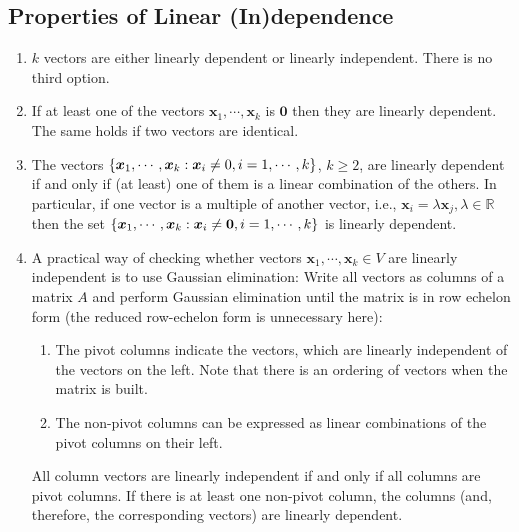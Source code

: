 \subsection{Properties of Linear (In)dependence}
\begin{enumerate}
    \item $k$ vectors are either linearly dependent or linearly independent. There is no third option.
    \hfill \cite{mfml/book/mml/Deisenroth-Faisal-Ong}

    \item If at least one of the vectors $\bm{x}_1, \cdots , \bm{x}_k$ is $\bm{0}$ then they are linearly dependent. 
    The same holds if two vectors are identical.
    \hfill \cite{mfml/book/mml/Deisenroth-Faisal-Ong}

    \item The vectors $\left\{\bm{x}_1, \cdots , \bm{x}_k : \bm{x}_i \neq 0, i = 1, \cdots , k\right\}$, $k \geq 2$, are linearly dependent if and only if (at least) one of them is a linear combination of the others. 
    In particular, if one vector is a multiple of another vector, i.e., $\bm{x}_i = \lambda \bm{x}_j , \lambda \in \mathbb{R}$ then the set $\left\{\bm{x}_1, \cdots , \bm{x}_k : \bm{x}_i \neq \bm{0}, i = 1, \cdots , k\right\}$ is linearly dependent.
    \hfill \cite{mfml/book/mml/Deisenroth-Faisal-Ong}

    \item A practical way of checking whether vectors $\bm{x}_1, \cdots , \bm{x}_k \in V$ are linearly independent is to use Gaussian elimination: 
    Write all vectors as columns of a matrix $A$ and perform Gaussian elimination until the matrix is in row echelon form (the reduced row-echelon form is unnecessary here):
    \hfill \cite{mfml/book/mml/Deisenroth-Faisal-Ong}
    \begin{enumerate}
        \item The pivot columns indicate the vectors, which are linearly independent of the vectors on the left. Note that there is an ordering of vectors when the matrix is built.
        \hfill \cite{mfml/book/mml/Deisenroth-Faisal-Ong}

        \item The non-pivot columns can be expressed as linear combinations of the pivot columns on their left.
        \hfill \cite{mfml/book/mml/Deisenroth-Faisal-Ong}
    \end{enumerate}

    All column vectors are linearly independent if and only if all columns are pivot columns. If there is at least one non-pivot column, the columns (and, therefore, the corresponding vectors) are linearly dependent.
    \hfill \cite{mfml/book/mml/Deisenroth-Faisal-Ong}


\end{enumerate}
